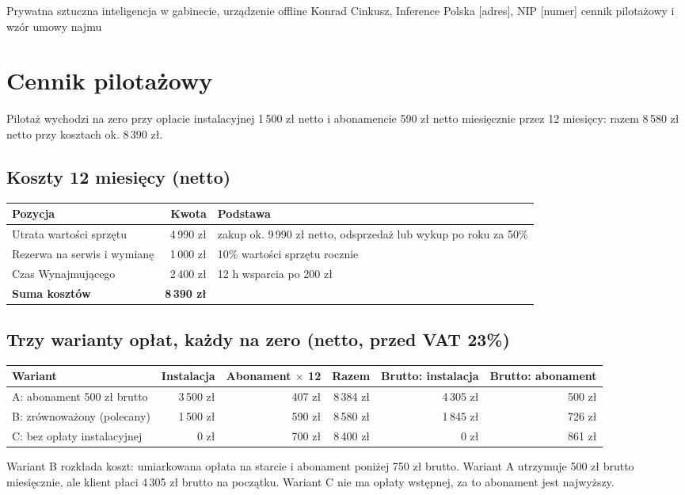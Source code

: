\documentclass[11pt,a4paper]{article}
\begin{document}
  {Prywatna sztuczna inteligencja w gabinecie, urządzenie offline}
  {Konrad Cinkusz, Inference Polska}
  {[adres], NIP [numer]}
  {cennik pilotażowy i wzór umowy najmu}

\section*{Cennik pilotażowy}

Pilotaż wychodzi na zero przy opłacie instalacyjnej 1\,500 zł netto i abonamencie 590 zł netto miesięcznie przez 12 miesięcy: razem 8\,580 zł netto przy kosztach ok. 8\,390 zł.

\subsection*{Koszty 12 miesięcy (netto)}
\begin{tabularx}{\linewidth}{@{}Xrl@{}}
\toprule
Pozycja & Kwota & Podstawa \\
\midrule
Utrata wartości sprzętu & 4\,990 zł & zakup ok. 9\,990 zł netto, odsprzedaż lub wykup po roku za 50\% \\
Rezerwa na serwis i wymianę & 1\,000 zł & 10\% wartości sprzętu rocznie \\
Czas Wynajmującego & 2\,400 zł & 12 h wsparcia po 200 zł \\
\midrule
\textbf{Suma kosztów} & \textbf{8\,390 zł} & \\
\bottomrule
\end{tabularx}

\subsection*{Trzy warianty opłat, każdy na zero (netto, przed VAT 23\%)}
\begin{tabularx}{\linewidth}{@{}Xrrrrr@{}}
\toprule
Wariant & Instalacja & Abonament $\times$ 12 & Razem & Brutto: instalacja & Brutto: abonament \\
\midrule
A: abonament 500 zł brutto & 3\,500 zł & 407 zł & 8\,384 zł & 4\,305 zł & 500 zł \\
B: zrównoważony (polecany) & 1\,500 zł & 590 zł & 8\,580 zł & 1\,845 zł & 726 zł \\
C: bez opłaty instalacyjnej & 0 zł & 700 zł & 8\,400 zł & 0 zł & 861 zł \\
\bottomrule
\end{tabularx}

Wariant B rozkłada koszt: umiarkowana opłata na starcie i abonament poniżej 750 zł brutto. Wariant A utrzymuje 500 zł brutto miesięcznie, ale klient płaci 4\,305 zł brutto na początku. Wariant C nie ma opłaty wstępnej, za to abonament jest najwyższy.
\end{document}
